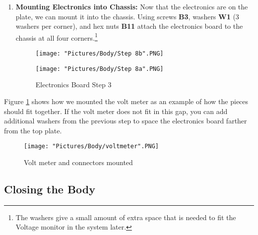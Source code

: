 \documentclass[12pt]{article}
\begin{document}
\begin{enumerate}
\item \textbf{Mounting Electronics into Chassis:} Now that the electronics are on the plate, we can mount it into the chassis. Using screws \textbf{B3}, washers \textbf{W1} (3 washers per corner), and hex nuts \textbf{B11} attach the electronics board to the chassis at all four corners.\footnote{The washers give a small amount of extra space that is needed to fit the Voltage monitor in the system later.}

\begin{figure}[H]
  \centering
  \begin{minipage}[b]{0.40\textwidth}
    \texttt{[image: "Pictures/Body/Step 8b".PNG]}
  \end{minipage}
  \hfill
  \begin{minipage}[b]{0.40\textwidth}
    \texttt{[image: "Pictures/Body/Step 8a".PNG]}
  \end{minipage}
  \caption{Electronics Board Step 3}
\end{figure}
\end{enumerate}

Figure \ref{vm} shows how we mounted the volt meter as an example of how the pieces should fit together. If the volt meter does not fit in this gap, you can add additional washers from the previous step to space the electronics board farther from the top plate. 
\begin{figure}[H]
  	\centering
    	\texttt{[image: "Pictures/Body/voltmeter".PNG]}
 	\caption{Volt meter and connectors mounted}
	\label{vm}
\end{figure}


\subsection{Closing the Body}
\end{document}
